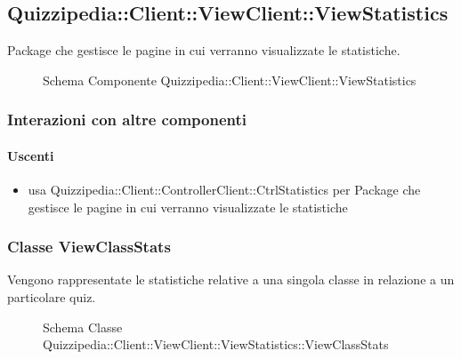 \subsection{Quizzipedia::Client::ViewClient::ViewStatistics}
Package che gestisce le pagine in cui verranno visualizzate le statistiche.
\begin{figure}[H]
\centering
\noindent{}
\caption[Schema Componente Quizzipedia::Client::ViewClient::ViewStatistics]{Schema Componente Quizzipedia::Client::ViewClient::ViewStatistics}
\end{figure}
\subsubsection{Interazioni con altre componenti}
\paragraph{Uscenti}
\begin{itemize}
\item usa Quizzipedia::Client::ControllerClient::CtrlStatistics per Package che gestisce le pagine in cui verranno visualizzate le statistiche
\end{itemize}
\subsubsection{Classe ViewClassStats}
Vengono rappresentate le statistiche relative a una singola classe in relazione a un particolare quiz.
\begin{figure}[H]
\centering
\noindent{}
\caption[Schema Classe ViewClassStats]{Schema Classe Quizzipedia::Client::ViewClient::ViewStatistics::ViewClassStats}
\end{figure}
